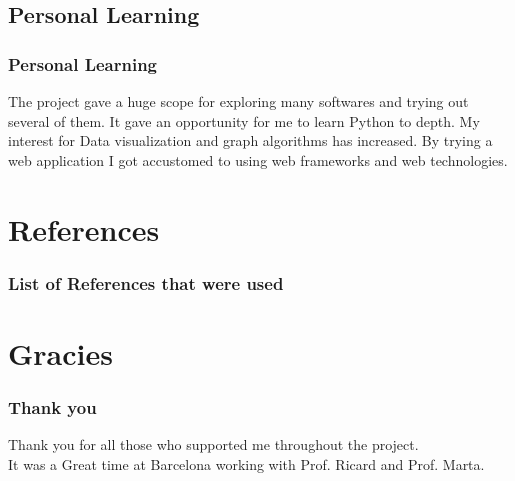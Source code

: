 \documentclass{beamer}
\begin{document}
\subsection{Personal Learning}
\frame
{
	\frametitle{Personal Learning}
The project gave a huge scope for exploring many softwares and trying out several of them. It gave an opportunity for me to learn Python to depth. My interest for Data visualization and graph algorithms has increased. By trying a web application I got accustomed to using web frameworks and web technologies. 
}




\section{References}

\frame
{
	\frametitle{List of References that were used}


{}
}

\section{Gracies}
\frame
{
	\frametitle{Thank you}
Thank you for all those who supported me throughout the project.\\
It was a Great time at Barcelona working with Prof. Ricard and Prof. Marta.

}
\end{document}

